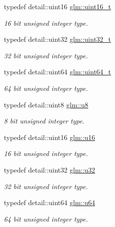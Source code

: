 \begin{DoxyCompactItemize}
typedef detail\-::uint16 \hyperlink{group__gtc__type__precision_gac4eb4f43cae8129b00086dc234d3b8fc}{glm\-::uint16\-\_\-t}
\begin{DoxyCompactList}\small\item\em 16 bit unsigned integer type. \end{DoxyCompactList}\item 
typedef detail\-::uint32 \hyperlink{group__gtc__type__precision_ga822ca53a9ad412504532838906276a99}{glm\-::uint32\-\_\-t}
\begin{DoxyCompactList}\small\item\em 32 bit unsigned integer type. \end{DoxyCompactList}\item 
typedef detail\-::uint64 \hyperlink{group__gtc__type__precision_ga058f57c19e1befdcf12498944bd73e69}{glm\-::uint64\-\_\-t}
\begin{DoxyCompactList}\small\item\em 64 bit unsigned integer type. \end{DoxyCompactList}\item 
typedef detail\-::uint8 \hyperlink{group__gtc__type__precision_ga5e3dc67373d5068997d2d9f41c9024d2}{glm\-::u8}
\begin{DoxyCompactList}\small\item\em 8 bit unsigned integer type. \end{DoxyCompactList}\item 
typedef detail\-::uint16 \hyperlink{group__gtc__type__precision_gae7a1571503f83d2264ddfa705a6b082a}{glm\-::u16}
\begin{DoxyCompactList}\small\item\em 16 bit unsigned integer type. \end{DoxyCompactList}\item 
typedef detail\-::uint32 \hyperlink{group__gtc__type__precision_ga54e837745059fd29017bed71cfa0a8db}{glm\-::u32}
\begin{DoxyCompactList}\small\item\em 32 bit unsigned integer type. \end{DoxyCompactList}\item 
typedef detail\-::uint64 \hyperlink{group__gtc__type__precision_ga71cedd4972f9cb1a5e14dfe5ab83ecd7}{glm\-::u64}
\begin{DoxyCompactList}\small\item\em 64 bit unsigned integer type. \end{DoxyCompactList}\item 

\end{DoxyCompactItemize}
